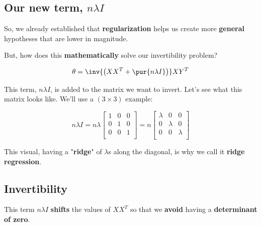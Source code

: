     \subsection*{Our new term, $n \lambda I$}
    
        So, we already established that \textbf{regularization} helps us create more \textbf{general} hypotheses that are lower in magnitude.
        
        But, how does this \textbf{mathematically} solve our invertibility problem?
        
        \begin{equation}
            \theta = 
                \inv{ 
                    \left(  XX^T + \pur{ n \lambda I } \right)  
                }
                XY^T
        \end{equation}
        
        This term, $n \lambda I$, is added to the matrix we want to invert. Let's see what this matrix looks like. We'll use a $(3 \times 3)$ example:
        
        \begin{equation}
            n \lambda I 
            = 
            n \lambda 
            \begin{bmatrix}
                1 & 0 & 0\\
                0 & 1 & 0\\
                0 & 0 & 1\\
            \end{bmatrix}
            =
            n
            \begin{bmatrix}
                \lambda & 0         & 0        \\
                0         & \lambda & 0        \\
                0         & 0         & \lambda\\
            \end{bmatrix}
        \end{equation}
        
        This visual, having a "\textbf{ridge}" of $\lambda$s along the diagonal, is why we call it \textbf{ridge regression}.
        
    \subsection*{Invertibility}
        
        This term $n\lambda I$ \textbf{shifts} the values of $XX^T$ so that we \textbf{avoid} having a \textbf{determinant of zero}.
        

